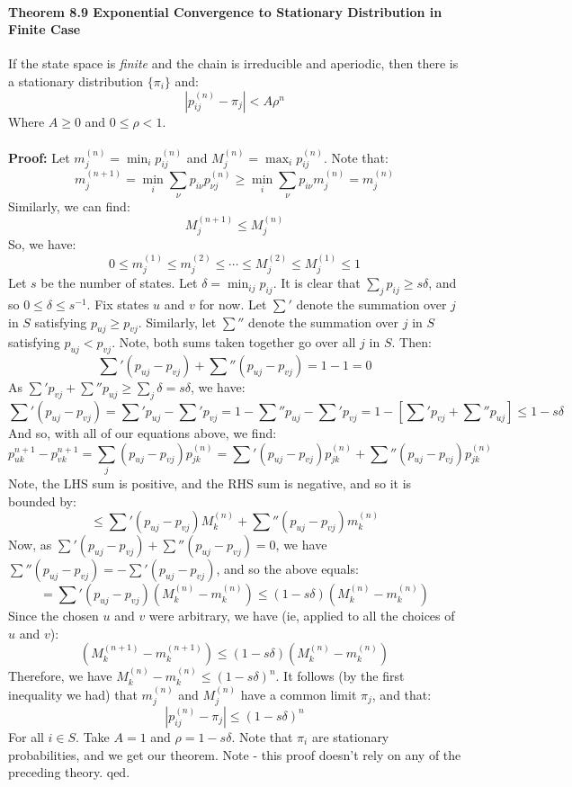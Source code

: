 \documentclass[12pt,a4paper]{article}
\newcommand{\1}[1]{\mathbbm{1}\left\{ #1 \right\}}
\begin{document}
\paragraph{Theorem 8.9 Exponential Convergence to Stationary Distribution in Finite Case} If the state space is \textit{finite} and the chain is irreducible and aperiodic, then there is a stationary distribution $\{\pi_i\}$ and:
$$
	|p_{ij}^{(n)} - \pi_j| < A\rho^n
$$
Where $A \geq 0$ and $0 \leq \rho < 1$.
\\\\
\textbf{Proof:} Let $m_j^{(n)} = \min_i p_{ij}^{(n)}$ and $M_j^{(n)} = \max_i p_{ij}^{(n)}$. Note that:
$$
	m_j^{(n+1)} = \min_i \sum_{\nu} p_{i\nu}p_{\nu j}^{(n)} \geq
	\min_i \sum_{\nu} p_{i\nu}m_j^{(n)} = m_j^{(n)}
$$
Similarly, we can find:
$$
	M_j^{(n+1)} \leq M_j^{(n)}
$$
So, we have:
$$
	0 \leq m_j^{(1)} \leq m_j^{(2)} \leq \cdots \leq M_j^{(2)} \leq M_j^{(1)} \leq 1
$$
Let $s$ be the number of states. Let $\delta = \min_{ij} p_{ij}$. It is clear that $\sum_j p_{ij} \geq s\delta$, and so $0 \leq \delta \leq s^{-1}$. Fix states $u$ and $v$ for now. Let $\sum'$ denote the summation over $j$ in $S$ satisfying $p_{uj} \geq p_{vj}$. Similarly, let $\sum''$ denote the summation over $j$ in $S$ satisfying $p_{uj} < p_{vj}$. Note, both sums taken together go over all $j$ in $S$. Then:
$$
	\sum' (p_{uj} - p_{vj}) + \sum'' (p_{uj} - p_{vj}) = 1 - 1 = 0
$$
As $\sum' p_{vj} + \sum'' p_{uj} \geq \sum_j \delta = s\delta$, we have:
$$
	\sum' (p_{uj} - p_{vj}) =
	\sum' p_{uj} - \sum' p_{vj} =
	1 - \sum'' p_{uj} - \sum' p_{vj} =
	1 - \left[\sum' p_{vj} + \sum'' p_{uj}\right] \leq 1 - s\delta
$$
And so, with all of our equations above, we find:
$$
	p_{uk}^{n+1} - p_{vk}^{n+1} =
	\sum_j (p_{uj} - p_{vj}) p_{jk}^{(n)} =
	\sum' (p_{uj} - p_{vj}) p_{jk}^{(n)} + \sum'' (p_{uj} - p_{vj}) p_{jk}^{(n)}
$$
Note, the LHS sum is positive, and the RHS sum is negative, and so it is bounded by:
$$
	\leq \sum' (p_{uj} - p_{vj}) M_k^{(n)} + \sum'' (p_{uj} - p_{vj}) m_k^{(n)}
$$
Now, as $\sum' (p_{uj} - p_{vj}) + \sum'' (p_{uj} - p_{vj}) = 0$, we have $\sum'' (p_{uj} - p_{vj}) = -\sum' (p_{uj} - p_{vj})$, and so the above equals:
$$
	= \sum' (p_{uj} - p_{vj}) (M_k^{(n)} - m_k^{(n)}) \leq
	(1-s\delta)(M_k^{(n)} - m_k^{(n)})
$$
Since the chosen $u$ and $v$ were arbitrary, we have (ie, applied to all the choices of $u$ and $v$):
$$
	(M_k^{(n + 1)} - m_k^{(n + 1)}) \leq (1-s\delta)(M_k^{(n)} - m_k^{(n)})
$$
Therefore, we have $M_k^{(n)} - m_k^{(n)} \leq (1-s\delta)^n$. It follows (by the first inequality we had) that $m_j^{(n)}$ and $M_j^{(n)}$ have a common limit $\pi_j$, and that:
$$
	\left|p_{ij}^{(n)} - \pi_j\right| \leq (1-s\delta)^n
$$
For all $i \in S$. Take $A = 1$ and $\rho = 1 - s\delta$. Note that $\pi_i$ are stationary probabilities, and we get our theorem. Note - this proof doesn't rely on any of the preceding theory. qed.
\end{document}
